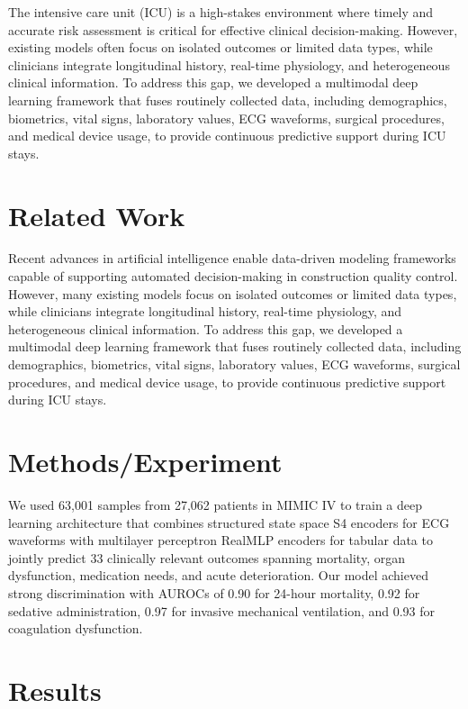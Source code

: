 \documentclass{article}
\begin{document}
        The intensive care unit (ICU) is a high-stakes environment where timely and accurate risk assessment is critical for effective clinical decision-making. However, existing models often focus on isolated outcomes or limited data types, while clinicians integrate longitudinal history, real-time physiology, and heterogeneous clinical information. To address this gap, we developed a multimodal deep learning framework that fuses routinely collected data, including demographics, biometrics, vital signs, laboratory values, ECG waveforms, surgical procedures, and medical device usage, to provide continuous predictive support during ICU stays.

        \section{Related Work}

        Recent advances in artificial intelligence enable data-driven modeling frameworks capable of supporting automated decision-making in construction quality control. However, many existing models focus on isolated outcomes or limited data types, while clinicians integrate longitudinal history, real-time physiology, and heterogeneous clinical information. To address this gap, we developed a multimodal deep learning framework that fuses routinely collected data, including demographics, biometrics, vital signs, laboratory values, ECG waveforms, surgical procedures, and medical device usage, to provide continuous predictive support during ICU stays.

        \section{Methods/Experiment}

        We used 63,001 samples from 27,062 patients in MIMIC IV to train a deep learning architecture that combines structured state space S4 encoders for ECG waveforms with multilayer perceptron RealMLP encoders for tabular data to jointly predict 33 clinically relevant outcomes spanning mortality, organ dysfunction, medication needs, and acute deterioration. Our model achieved strong discrimination with AUROCs of 0.90 for 24-hour mortality, 0.92 for sedative administration, 0.97 for invasive mechanical ventilation, and 0.93 for coagulation dysfunction.

        \section{Results}
\end{document}
